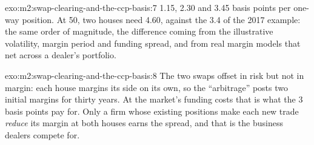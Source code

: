 \begin{solution}{exo:m2:swap-clearing-and-the-ccp-basis:7}
1.15, 2.30 and 3.45 basis points per one-way position. At 50, two houses need
4.60, against the 3.4 of the 2017 example: the same order of magnitude, the
difference coming from the illustrative volatility, margin period and funding
spread, and from real margin models that net across a dealer's portfolio.
\end{solution}

\begin{solution}{exo:m2:swap-clearing-and-the-ccp-basis:8}
The two swaps offset in risk but not in margin: each house margins its side on
its own, so the ``arbitrage'' posts two initial margins for thirty years. At the
market's funding costs that is what the 3 basis points pay for. Only a firm
whose existing positions make each new trade \emph{reduce} its margin at both
houses earns the spread, and that is the business dealers compete for.
\end{solution}

